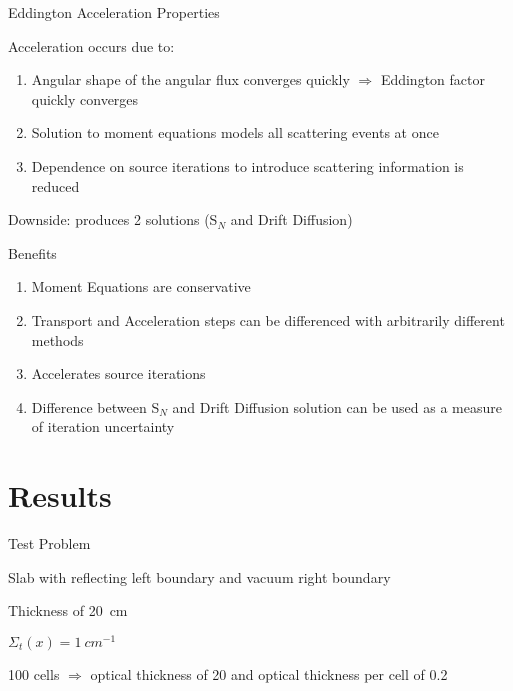 \documentclass[10pt]{beamer}
\newcommand{\SN}{S$_N$\xspace}
\begin{document}
\begin{frame}{Eddington Acceleration Properties}
    
    Acceleration occurs due to: 
    \begin{enumerate}
    	\item Angular shape of the angular flux converges quickly $\Rightarrow$ Eddington factor quickly converges 

    	\item Solution to moment equations models all scattering events at once 

    	\item Dependence on source iterations to introduce scattering information is reduced

    \end{enumerate}

    Downside: produces 2 solutions (\SN and Drift Diffusion)

    Benefits 
    \begin{enumerate}
        \item Moment Equations are conservative 

        \item Transport and Acceleration steps can be differenced with arbitrarily different methods 

        \item Accelerates source iterations 

        \item Difference between \SN and Drift Diffusion solution can be used as a measure of iteration uncertainty 

    \end{enumerate}

\end{frame}

\section{Results}

\begin{frame}{Test Problem} 

	Slab with reflecting left boundary and vacuum right boundary 

    Thickness of \SI{20}{cm} 

    $\Sigma_t(x) = \SI{1}{cm^{-1}}$

    100 cells $\Rightarrow$ optical thickness of 20 and optical thickness per cell of 0.2 

\end{frame}
\end{document}
